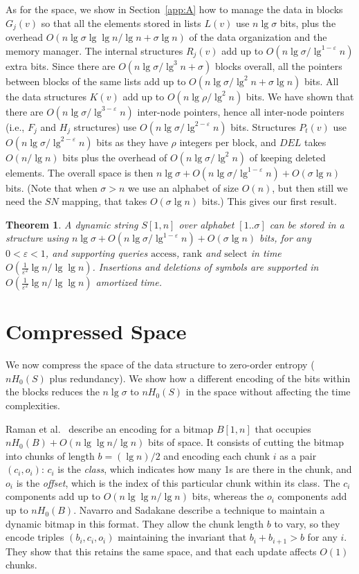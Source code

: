 \documentclass[11pt]{article}
\def\idrm#1{\ensuremath{\mathrm{#1}}}
\newtheorem{theorem}{Theorem}
\newcommand{\cP}{{ K}}
\newcommand{\ra}{\idrm{rank}}
\newcommand{\sel}{\idrm{select}}
\newcommand{\acc}{\idrm{access}}
\newcommand{\eps}{\varepsilon}
\begin{document}
As for the space,
we show in Section~\ref{app:A} how to manage the data in blocks $G_j(v)$ 
so that all the elements stored in lists $L(v)$ use $n\lg \sigma$ bits, plus
the overhead $O(n\lg\sigma\lg\lg n/\lg n + \sigma\lg n)$ of the data
organization and the memory manager.
The internal structures
$R_j(v)$ add up to $O(n\lg\sigma/\lg^{1-\eps} n)$ extra bits.
Since there are $O(n\lg\sigma/\lg^3 n + \sigma)$ blocks overall,
all the pointers between blocks of 
the same lists add up to $O(n\lg\sigma/\lg^2 n + \sigma\lg n)$ bits. 
All the data structures $\cP(v)$ add up to $O(n\lg\rho/\lg^2 n)$ bits. 
We have shown that there are
$O(n\lg\sigma/\lg^{3-\eps} n)$ inter-node pointers, hence all inter-node 
pointers (i.e., $F_j$ and $H_j$ structures) use 
$O(n\lg\sigma/\lg^{2-\eps}n)$ bits. 
Structures $P_t(v)$ use $O(n\lg\sigma/\lg^{2-\eps} n)$
bits as they have $\rho$ integers per block, and $DEL$ takes $O(n/\lg n)$ bits
plus the overhead of $O(n\lg\sigma/\lg^2 n)$ of keeping deleted elements.
The overall space is then 
$n\lg\sigma + O(n\lg\sigma/\lg^{1-\eps} n) + O(\sigma\lg n)$ bits.
(Note that when $\sigma > n$ we use an alphabet of size $O(n)$, but then still
we need the $SN$ mapping, that takes $O(\sigma\lg n)$ bits.)
This gives our first result.

\begin{theorem}
\label{thm:optimal}
A dynamic string $S[1,n]$ over alphabet $[1..\sigma]$ 
can be stored in a structure using 
$n\lg\sigma + O(n\lg\sigma/\lg^{1-\eps} n) + O(\sigma\lg n)$ bits,
for any $0<\eps<1$,
and supporting queries
$\acc$, $\ra$ and $\sel$ in time $O(\frac{1}{\eps^2}\lg n/\lg \lg n)$.
Insertions and deletions of symbols 
are supported in $O(\frac{1}{\eps^2}\lg n/\lg \lg n)$ amortized time. 
\end{theorem}

\section{Compressed Space}
\label{sec:rrr}

We now compress the space of the data structure to
zero-order entropy ($nH_0(S)$ plus redundancy).
We show how a different encoding of the bits within the blocks reduces
the $n\lg\sigma$ to $nH_0(S)$ in the space without affecting the time
complexities. 

Raman et al.\ \cite{RRR07} describe an encoding for a bitmap $B[1,n]$ that
occupies $nH_0(B) + O(n\lg\lg n /\lg n)$ bits of space. It consists of
cutting the bitmap into chunks of length $b = (\lg n)/2$ and encoding each
chunk $i$ as a pair $(c_i,o_i)$: $c_i$ is the {\em class}, which indicates how 
many 1s are there in the chunk, and $o_i$ is the {\em offset}, which is the 
index of this particular chunk within its class. The $c_i$ components add up to
$O(n\lg\lg n / \lg n)$ bits, whereas the $o_i$ components add up to $nH_0(B)$.
Navarro and Sadakane \cite[Sec.\ 8]{NS10} describe a technique to maintain a 
dynamic bitmap in this format. They allow the chunk length $b$ to vary, so 
they encode triples $(b_i,c_i,o_i)$ maintaining the invariant that 
$b_i+b_{i+1} > b$ for any $i$. They show that this retains the same space, 
and that each update affects $O(1)$ chunks.
\end{document}
